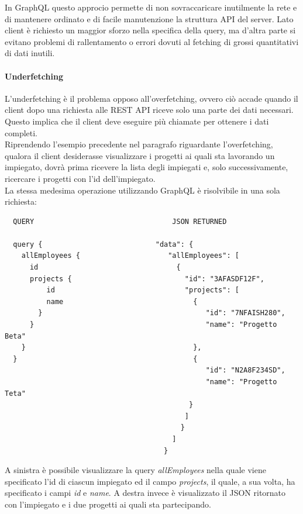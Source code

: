 In GraphQL questo approcio permette di non sovraccaricare inutilmente la rete e di mantenere ordinato e di facile manutenzione la struttura API del server. Lato client è richiesto un maggior sforzo nella specifica della query, ma d'altra parte si evitano problemi di rallentamento o errori dovuti al fetching di grossi quantitativi di dati inutili.
\paragraph{Underfetching}
L'underfetching è il problema opposo all'overfetching, ovvero ciò accade quando il client dopo una richiesta alle REST API riceve solo una parte dei dati necessari. Questo implica che il client deve eseguire più chiamate per ottenere i dati completi.\\
Riprendendo l'esempio precedente nel paragrafo riguardante l'overfetching, qualora il client desiderasse visualizzare i progetti ai quali sta lavorando un impiegato, dovrà prima ricevere la lista degli impiegati e, solo successivamente, ricercare i progetti con l'id dell'impiegato.\\
La stessa medesima operazione utilizzando GraphQL è risolvibile in una sola richiesta:
\begin{verbatim}
  QUERY                                 JSON RETURNED

  query {                           "data": {
    allEmployees {                     "allEmployees": [
      id                                 {
      projects {                           "id": "3AFASDF12F",
          id                               "projects": [
          name                               {
        }                                       "id": "7NFAISH280",
      }                                         "name": "Progetto Beta"
    }                                        },
  }                                          {
                                                "id": "N2A8F234SD",
                                                "name": "Progetto Teta"
                                            }
                                           ]
                                          }
                                        ]
                                      }
\end{verbatim}
A sinistra è possibile visualizzare la query \textit{allEmployees} nella quale viene specificato l'id di ciascun impiegato ed il campo \textit{projects}, il quale, a sua volta, ha specificato i campi \textit{id} e \textit{name}. A destra invece è visualizzato il JSON ritornato con l'impiegato e i due progetti ai quali sta partecipando.
